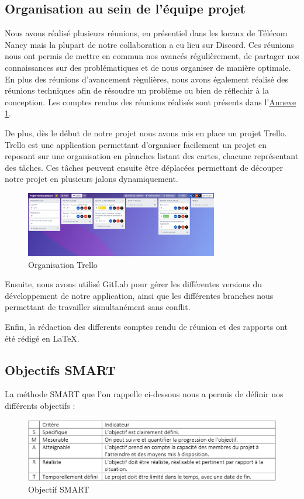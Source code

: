 \documentclass[french,a4paper]{article}
\begin{document}
\subsection{Organisation au sein de l’équipe projet}
Nous avons réalisé plusieurs réunions, en présentiel dans les locaux de Télécom Nancy mais la plupart de notre collaboration a eu lieu sur Discord. Ces réunions nous ont permis de mettre en commun nos avancés régulièrement, de partager nos connaissances sur des problématiques et de nous organiser de manière optimale.
En plus des réunions d'avancement règulières, nous avons également réalisé des réunions techniques afin de résoudre un problème ou bien de réflechir à la conception.
Les comptes rendus des réunions réalisés sont présents dans l’\hyperlink{annexe1}{Annexe 1}.

De plus, dès le début de notre projet nous avons mis en place un projet Trello. Trello est une application permettant d’organiser facilement un projet en reposant sur une organisation en planches listant des cartes, chacune représentant des tâches. Ces tâches peuvent ensuite être déplacées permettant de découper notre projet en plusieurs jalons dynamiquement.
\begin{figure}[H]
    \centering
    \includegraphics[width=0.75\textwidth]{img/trello.png}
    \caption{Organisation Trello}
\end{figure}

Ensuite, nous avons utilisé GitLab pour gérer les différentes versions du développement de notre application, ainsi que les différentes branches nous permettant de travailler simultanément sans conflit.

Enfin, la rédaction des differents comptes rendu de réunion et des rapports ont été rédigé en \LaTeX.

\subsection{Objectifs SMART}
La méthode SMART que l'on rappelle ci-dessous nous a permis de définir nos différents objectifs :

\begin{figure}[H]
    \centering
    \includegraphics[width=1\textwidth]{img/SMART.png}
    \caption{Objectif SMART}
\end{figure}
\end{document}
